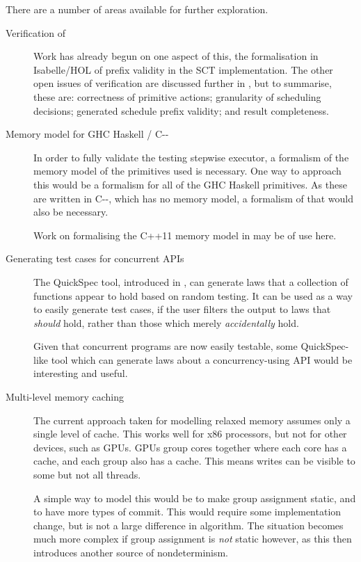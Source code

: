 There are a number of areas available for further exploration. 

\begin{description}
\item[Verification of \dejafu{}] \hfill

  Work has already begun on one aspect of this, the formalisation in
  Isabelle/HOL of prefix validity in the SCT implementation. The other
  open issues of verification are discussed further in
  , but to summarise, these are: correctness of
  primitive actions; granularity of scheduling decisions; generated
  schedule prefix validity; and result completeness.

\item[Memory model for GHC Haskell / C{-}{-}] \hfill

  In order to fully validate the testing stepwise executor, a
  formalism of the memory model of the primitives used is
  necessary. One way to approach this would be a formalism for all of
  the GHC Haskell primitives. As these are written in C{-}{-}, which
  has no memory model, a formalism of that would also be necessary.

  Work on formalising the C++11 memory model in \citep{c++11} may be
  of use here.

\item[Generating test cases for concurrent APIs] \hfill

  The QuickSpec tool, introduced in \citep{quickspec}, can generate
  laws that a collection of functions appear to hold based on random
  testing. It can be used as a way to easily generate test cases, if
  the user filters the output to laws that \emph{should} hold, rather
  than those which merely \emph{accidentally} hold.

  Given that concurrent programs are now easily testable, some
  QuickSpec-like tool which can generate laws about a
  concurrency-using API would be interesting and useful.

\item[Multi-level memory caching] \hfill

  The current approach taken for modelling relaxed memory assumes only
  a single level of cache. This works well for x86 processors, but not
  for other devices, such as GPUs. GPUs group cores together where
  each core has a cache, and each group also has a cache. This means
  writes can be visible to some but not all threads.

  A simple way to model this would be to make group assignment static,
  and to have more types of commit. This would require some
  implementation change, but is not a large difference in
  algorithm. The situation becomes much more complex if group
  assignment is \emph{not} static however, as this then introduces
  another source of nondeterminism.


\end{description}
